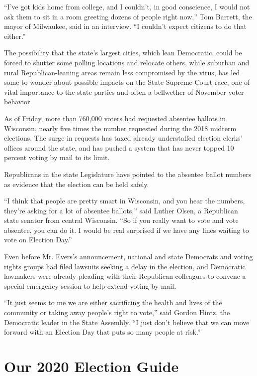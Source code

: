 ``I've got kids home from college, and I couldn't, in good conscience, I
would not ask them to sit in a room greeting dozens of people right
now,'' Tom Barrett, the mayor of Milwaukee, said in an interview. ``I
couldn't expect citizens to do that either.''

The possibility that the state's largest cities, which lean Democratic,
could be forced to shutter some polling locations and relocate others,
while suburban and rural Republican-leaning areas remain less
compromised by the virus, has led some to wonder about possible impacts
on the State Supreme Court race, one of vital importance to the state
parties and often a bellwether of November voter behavior.

As of Friday, more than 760,000 voters had requested absentee ballots in
Wisconsin, nearly five times the number requested during the 2018
midterm elections. The surge in requests has taxed already understaffed
election clerks' offices around the state, and has pushed a system that
has never topped 10 percent voting by mail to its limit.

Republicans in the state Legislature have pointed to the absentee ballot
numbers as evidence that the election can be held safely.

``I think that people are pretty smart in Wisconsin, and you hear the
numbers, they're asking for a lot of absentee ballots,'' said Luther
Olsen, a Republican state senator from central Wisconsin. ``So if you
really want to vote and vote absentee, you can do it. I would be real
surprised if we have any lines waiting to vote on Election Day.''

Even before Mr. Evers's announcement, national and state Democrats and
voting rights groups had filed lawsuits seeking a delay in the election,
and Democratic lawmakers were already pleading with their Republican
colleagues to convene a special emergency session to help extend voting
by mail.

``It just seems to me we are either sacrificing the health and lives of
the community or taking away people's right to vote,'' said Gordon
Hintz, the Democratic leader in the State Assembly. ``I just don't
believe that we can move forward with an Election Day that puts so many
people at risk.''

\hypertarget{our-2020-election-guide}{%
\section{Our 2020 Election Guide}\label{our-2020-election-guide}}

